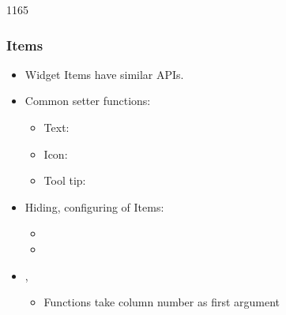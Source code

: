 \begin{slide}{1165}\frametitle{Items}

\begin{itemize}
\item Widget Items have similar APIs.
\item Common setter functions:
  \begin{itemize}
  \item Text: 
  \item Icon: 
  \item Tool tip: 
  \end{itemize}
\item Hiding, configuring of Items:
  \begin{itemize}
  \item {}
  \item {}
  \end{itemize}
  
\item {}, 
  \begin{itemize}
  \item Functions take column number as first argument
  \end{itemize}
\end{itemize}

\end{slide}

